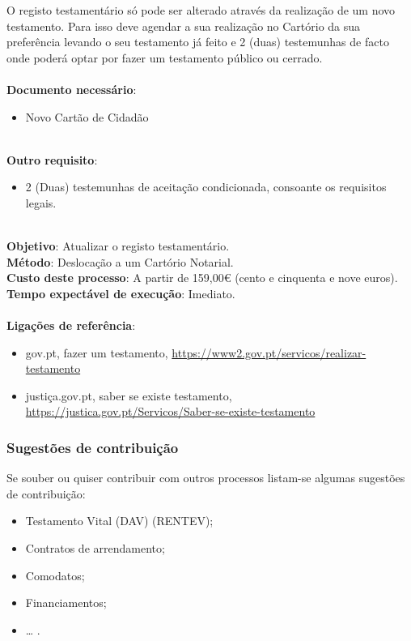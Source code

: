 O registo testamentário só pode ser alterado através da realização de um
novo testamento. Para isso deve agendar a sua realização no Cartório da
sua preferência levando o seu testamento já feito e 2 (duas) testemunhas
de facto onde poderá optar por fazer um testamento público ou cerrado. \\
\\
\textbf{Documento necessário}:
\begin{itemize}
	\item Novo Cartão de Cidadão
\end{itemize}
\leavevmode\\
\textbf{Outro requisito}:
\begin{itemize}
	\item 2 (Duas) testemunhas de aceitação condicionada, consoante os requisitos legais.
\end{itemize}
\leavevmode\\
\textbf{Objetivo}: Atualizar o registo testamentário. \\
\textbf{Método}: Deslocação a um Cartório Notarial. \\
\textbf{Custo deste processo}: A partir de 159,00€ (cento e cinquenta e nove euros). \\
\textbf{Tempo expectável de execução}: Imediato. \\
\\
\textbf{Ligações de referência}:
\begin{itemize}
	\item gov.pt, fazer um testamento, \url{https://www2.gov.pt/servicos/realizar-testamento}
	\item justiça.gov.pt, saber se existe testamento, \url{https://justica.gov.pt/Servicos/Saber-se-existe-testamento}
\end{itemize}

\subsubsection{Sugestões de contribuição}

Se souber ou quiser contribuir com outros processos listam-se algumas
sugestões de contribuição:
\begin{itemize}
	\item Testamento Vital (DAV) (RENTEV);
	\item Contratos de arrendamento;
	\item Comodatos;
	\item Financiamentos;
	\item \ldots{} .
\end{itemize}